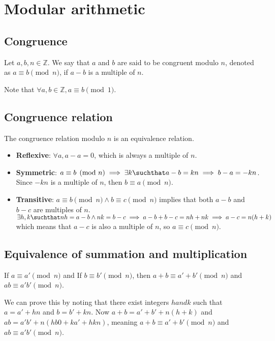 \documentclass[a4paper]{article}
\begin{document}

\pagebreak

\section{Modular arithmetic}

\subsection{Congruence}

Let \(a,b,n\in\mathbb{Z}\).
We say that \(a\) and \(b\) are said to be congruent modulo \(n\),
denoted as \(a \equiv b \pmod{n}\), if \(a-b\) is a multiple of \(n\).

Note that \(\forall a,b \in \mathbb{Z}, a \equiv b \pmod{1}\).

\subsection{Congruence relation}

The congruence relation modulo \(n\) is an equivalence relation.

\begin{itemize}
    \item \textbf{Reflexive}: \(\forall a, a-a = 0\), which is always a multiple of \(n\).
    \item \textbf{Symmetric}: \(a \equiv b \pmod{n} \implies \exists k \suchthat a-b=kn \implies b-a=-kn\).
    Since \(-kn\) is a multiple of \(n\), then \(b \equiv a \pmod{n}\).
    \item \textbf{Transitive}: \(a \equiv b \pmod{n} \land b \equiv c \pmod{n}\) implies that both
    \(a-b\) and \(b - c\) are multiples of \(n\).
    \(\exists h, k \suchthat nh=a-b \land nk=b-c \implies a-b+b-c=nh+nk \implies a-c=n(h+k)\)
    which means that \(a-c\) is also a multiple of \(n\), so \(a \equiv c \pmod{n}\).
\end{itemize}

\subsection{Equivalence of summation and multiplication}

If \(a \equiv a' \pmod{n}\) and If \(b \equiv b' \pmod{n}\), then
\(a+b \equiv a' + b' \pmod{n}\) and \(ab \equiv a'b' \pmod{n}\).

We can prove this by noting that there exist integers \(h and k\) such that
\(a=a'+hn\) and \(b=b'+kn\).
Now \(a+b = a'+b'+n(h+k)\) and \(ab=a'b' + n(hb0+ka'+hkn)\), meaning
\(a+b \equiv a' + b' \pmod{n}\) and \(ab \equiv a'b' \pmod{n}\).
\end{document}
